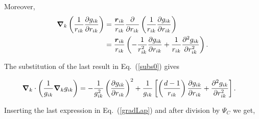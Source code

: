 Moreover, 
\begin{align*}
\boldsymbol{\nabla}_k \left(\frac{1}{r_{ik}}\frac{\partial g_{ik}}{\partial r_{ik}}\right) &= \frac{\boldsymbol{r}_{ik}}{r_{ik}} \frac{\partial }{\partial r_{ik}} \left(\frac{1}{r_{ik}}\frac{\partial g_{ik}}{\partial r_{ik}}\right)\nonumber\\
&=\frac{\boldsymbol{r}_{ik}}{r_{ik}}\left(-\frac{1}{r_{ik}^2}\frac{\partial g_{ik}}{\partial r_{ik}} + \frac{1}{r_{ik}}\frac{\partial^2 g_{ik}}{\partial r_{ik}^2}\right).\label{subs1}
\end{align*}

The substitution of the last result in Eq.~(\ref{subs0}) gives

\begin{align*}
  \boldsymbol{\nabla}_k \cdot \left(\frac{1}{g_{ik}}\boldsymbol{\nabla}_k g_{ik}\right) &= -\frac{1}{g_{ik}^2}\left(\frac{\partial g_{ik}}{\partial r_{ik}}\right)^2 + \frac{1}{g_{ik}}\left[\left(\frac{d-1}{r_{ik}}\right)\frac{\partial g_{ik}}{\partial r_{ik}} + \frac{\partial^2 g_{ik}}{\partial r_{ik}^2} \right].
\end{align*}

Inserting the last expression in Eq.~(\ref{gradLap}) and after division by $\Psi_C$ we get,


